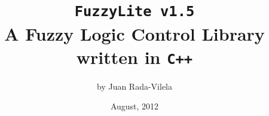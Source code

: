 \documentclass[11pt, final, a4paper, openany]{book}
\newcommand{\fl}{\texttt{FuzzyLite v1.5}}
\begin{document}
	\title{\fl\\ A Fuzzy Logic Control Library written in \texttt{C++}}
	\author{by Juan Rada-Vilela}
	\date{August, 2012}
	
	\maketitle
	\setcounter{tocdepth}{4}
	
	\tableofcontents
	\listoffigures
	\pagestyle{fancy}	

	
	
	
	
	
\end{document}
